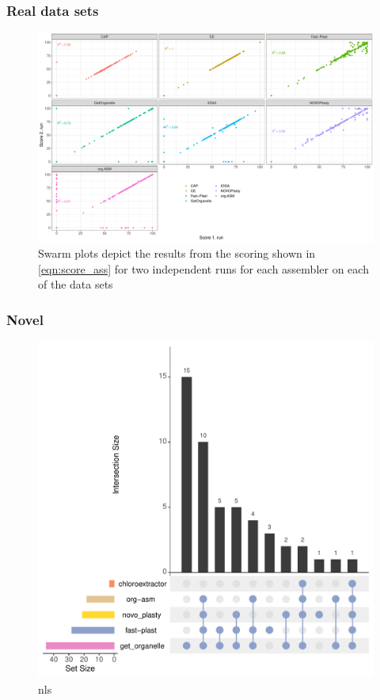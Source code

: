 \subsubsection{Real data sets}
\begin{figure}[H]
\centering
\includegraphics[height=.45\textheight, width=.95\textwidth]{Figures/repro}
\decoRule
\caption[Comparison between two runs with the same assembler for consistency testing ]{Swarm plots depict the results from the scoring shown in \ref{eqn:score_ass} for two independent runs for each assembler on each of the data sets}
\label{fig:consisplot}
\end{figure}


\subsubsection{Novel}


\begin{figure}[H]
\centering
\includegraphics[height=.45\textheight, width=.95\textwidth]{Figures/upset_novel}
\decoRule
\caption[Upset plot comparing the success rates for novel data sets]{nls}
\label{fig:upset_novel}
\end{figure}

